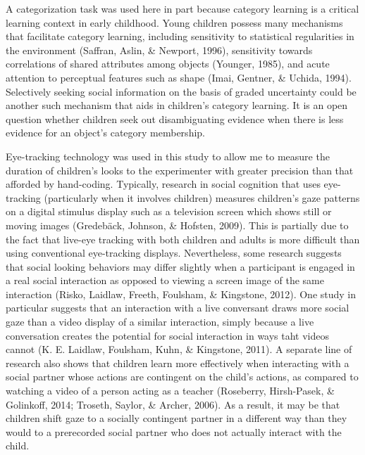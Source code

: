 \documentclass[floatsintext,man]{apa6}
\theoremstyle{definition}
\theoremstyle{definition}
\theoremstyle{definition}
\theoremstyle{remark}
\begin{document}
A categorization task was used here in part because category learning is
a critical learning context in early childhood. Young children possess
many mechanisms that facilitate category learning, including sensitivity
to statistical regularities in the environment (Saffran, Aslin, \&
Newport, 1996), sensitivity towards correlations of shared attributes
among objects (Younger, 1985), and acute attention to perceptual
features such as shape (Imai, Gentner, \& Uchida, 1994). Selectively
seeking social information on the basis of graded uncertainty could be
another such mechanism that aids in children's category learning. It is
an open question whether children seek out disambiguating evidence when
there is less evidence for an object's category membership.

Eye-tracking technology was used in this study to allow me to measure
the duration of children's looks to the experimenter with greater
precision than that afforded by hand-coding. Typically, research in
social cognition that uses eye-tracking (particularly when it involves
children) measures children's gaze patterns on a digital stimulus
display such as a television screen which shows still or moving images
(Gredebäck, Johnson, \& Hofsten, 2009). This is partially due to the
fact that live-eye tracking with both children and adults is more
difficult than using conventional eye-tracking displays. Nevertheless,
some research suggests that social looking behaviors may differ slightly
when a participant is engaged in a real social interaction as opposed to
viewing a screen image of the same interaction (Risko, Laidlaw, Freeth,
Foulsham, \& Kingstone, 2012). One study in particular suggests that an
interaction with a live conversant draws more social gaze than a video
display of a similar interaction, simply because a live conversation
creates the potential for social interaction in ways taht videos cannot
(K. E. Laidlaw, Foulsham, Kuhn, \& Kingstone, 2011). A separate line of
research also shows that children learn more effectively when
interacting with a social partner whose actions are contingent on the
child's actions, as compared to watching a video of a person acting as a
teacher (Roseberry, Hirsh-Pasek, \& Golinkoff, 2014; Troseth, Saylor, \&
Archer, 2006). As a result, it may be that children shift gaze to a
socially contingent partner in a different way than they would to a
prerecorded social partner who does not actually interact with the
child.
\end{document}
